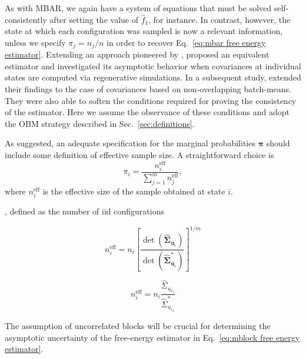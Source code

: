 \documentclass[journal=jctcce,manuscript=article,layout=twocolumn]{achemso}
\newcommand{\mt}[1]{\boldsymbol{\mathbf{#1}}}   %
\newcommand{\vt}[1]{\boldsymbol{\mathbf{#1}}}   %
\newcommand{\avg}[1]{\overline{#1}}             %
\begin{document}
As with MBAR, we again have a system of equations that must be solved self-consistently after setting the value of $\hat f_1$, for instance. In contrast, however, the state at which each configuration was sampled is now a relevant information, unless we specify $\pi_j = {n_j}/{n}$ in order to recover Eq.~\eqref{eq:mbar free energy estimator}. Extending an approach pioneered by \citeauthor{Geyer_1994} \cite{Geyer_1994}, \citeauthor{Doss_2014} \cite{Doss_2014} proposed an equivalent estimator and investigated its asymptotic behavior when covariances at individual states are computed via regenerative simulations. In a subsequent study, \citeauthor{Roy_2018} \cite{Roy_2018} extended their findings to the case of covariances based on non-overlapping batch-means. They were also able to soften the conditions required for proving the consistency of the estimator. Here we assume the observance of these conditions and adopt the OBM strategy described in Sec.~\ref{sec:definitions}. 

As \citeauthor{Roy_2018} \cite{Roy_2018} suggested, an adequate specification for the marginal probabilities $\vt \pi$ should include some definition of effective sample size. A straightforward choice is
\begin{equation}
\label{eq:mblock prior}
\pi_i = \frac{n^\text{eff}_i}{\sum_{j=1}^m n^\text{eff}_j},
\end{equation}
where $n^\text{eff}_i$ is the effective size of the sample obtained at state $i$.

, defined as the number of iid configurations 

\begin{equation*}
n^\text{eff}_i = n_i \left[\frac{\det(\hat{\mt \Sigma}_{\avg{\vt u}_i})}{\det(\hat{\mt \Sigma}^\ast_{\avg{\vt u}_i})}\right]^{1/m}
\end{equation*}

\begin{equation*}
n^\text{eff}_i = n_i \frac{\hat{\Sigma}_{\avg{u_i}_i}}{\hat{\Sigma}^\ast_{\avg{u_i}_i}}
\end{equation*}

The assumption of uncorrelated blocks will be crucial for determining the asymptotic uncertainty of the free-energy estimator in Eq.~\eqref{eq:mblock free energy estimator}.
\end{document}
